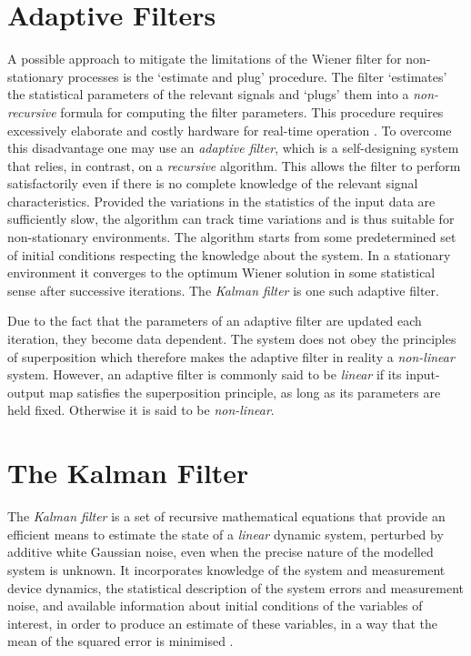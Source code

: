 \section{Adaptive Filters}

A possible approach to mitigate the limitations of the Wiener filter for non-stationary processes is the `estimate and plug' procedure. The filter `estimates' the statistical parameters of the relevant signals and `plugs' them into a \emph{non-recursive} formula for computing the filter parameters. This procedure requires excessively elaborate and costly hardware for real-time operation \cite{haykin2002adaptive}. To overcome this disadvantage one may use an \emph{adaptive filter}, which is a self-designing system that relies, in contrast, on a \emph{recursive} algorithm. This allows the filter to perform satisfactorily even if there is no complete knowledge of the relevant signal characteristics. Provided the variations in the  statistics of the input data are sufficiently slow, the algorithm can track time variations and is thus suitable for non-stationary environments. The algorithm starts from some predetermined set of initial conditions respecting the knowledge about the system. In a stationary environment it converges to the optimum Wiener solution in some statistical sense after successive iterations. The \emph{Kalman filter} is one such adaptive filter.

Due to the fact that the parameters of an adaptive filter are updated each iteration, they become data dependent. The system does not obey the principles of superposition which therefore makes the adaptive filter in reality a \emph{non-linear} system. However, an adaptive filter is commonly said to be \emph{linear} if its input-output map satisfies the superposition principle, as long as its parameters are held fixed. Otherwise it is said to be \emph{non-linear}.

\section{The Kalman Filter}

The \emph{Kalman filter} is a set of recursive mathematical equations that provide an efficient means to estimate the state of a \emph{linear} dynamic system, perturbed by additive white Gaussian noise, even when the precise nature of the modelled system is unknown. It incorporates knowledge of the system and measurement device dynamics, the statistical description of the system errors and measurement noise, and available information about initial conditions of the variables of interest, in order to produce an estimate of these variables, in a way that the mean of the squared error is minimised \cite{Maybeck79}. 

